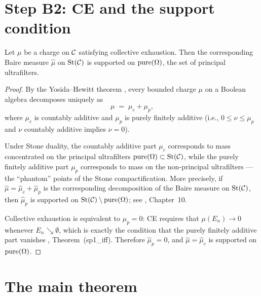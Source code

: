 \section{Step B2: CE and the support condition}
\label{sec:B2}

\begin{proposition}
\label{prop:B2}
Let $\mu$ be a charge on $\mathcal{C}$ satisfying collective exhaustion.  Then the
corresponding Baire measure $\hat{\mu}$ on $\mathrm{St}(\mathcal{C})$ is supported on
$\mathrm{pure}(\Omega)$, the set of principal ultrafilters.
\end{proposition}

\begin{proof}
By the Yosida--Hewitt theorem \cite{yosida1952}, every bounded charge $\mu$ on a
Boolean algebra decomposes uniquely as
\[
  \mu \;=\; \mu_c + \mu_p,
\]
where $\mu_c$ is countably additive and $\mu_p$ is purely finitely additive (i.e.,
$0 \leq \nu \leq \mu_p$ and $\nu$ countably additive implies $\nu = 0$).

Under Stone duality, the countably additive part $\mu_c$ corresponds to mass
concentrated on the principal ultrafilters $\mathrm{pure}(\Omega) \subset \mathrm{St}(\mathcal{C})$, while
the purely finitely additive part $\mu_p$ corresponds to mass on the non-principal
ultrafilters --- the ``phantom'' points of the Stone compactification.  More precisely,
if $\hat{\mu} = \hat{\mu}_c + \hat{\mu}_p$ is the corresponding decomposition of the
Baire measure on $\mathrm{St}(\mathcal{C})$, then $\hat{\mu}_p$ is supported on
$\mathrm{St}(\mathcal{C}) \setminus \mathrm{pure}(\Omega)$; see \cite{rao1983}, Chapter~10.

Collective exhaustion is equivalent to $\mu_p = 0$: CE requires that $\mu(E_n) \to 0$
whenever $E_n \searrow \emptyset$, which is exactly the condition that the purely
finitely additive part vanishes \cite{mahon_paper0}, Theorem~(sp1\_iff).  Therefore
$\hat{\mu}_p = 0$, and $\hat{\mu} = \hat{\mu}_c$ is supported on $\mathrm{pure}(\Omega)$.
\end{proof}

\section{The main theorem}
\label{sec:assembly}

